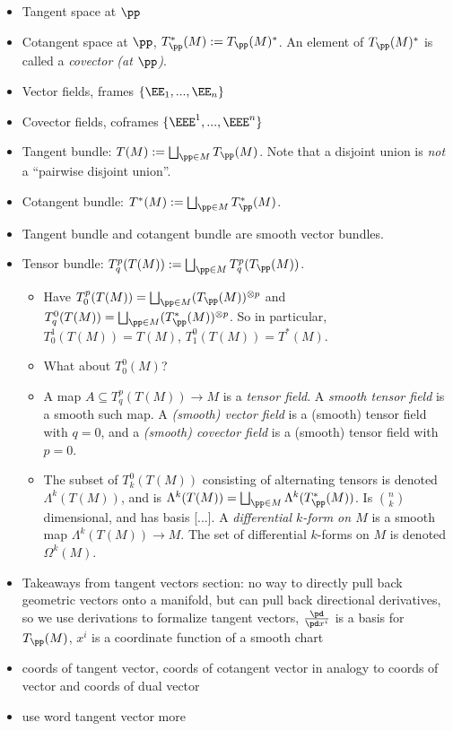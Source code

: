 \begin{itemize}
    \item Tangent space at $\pp$
    \item Cotangent space at $\pp$, $T_\pp^*(M) := T_\pp(M)^*$. An element of $T_\pp(M)^*$ is called a \textit{covector (at $\pp$)}.
    \item Vector fields, frames $\{\EE_1, ..., \EE_n\}$
    \item Covector fields, coframes $\{\EEE^1, ..., \EEE^n\}$
    \item Tangent bundle: $T(M) := \bigsqcup_{\pp \in M} T_\pp(M)$. Note that a disjoint union is \textit{not} a ``pairwise disjoint union''.
    \item Cotangent bundle: $T^*(M) := \bigsqcup_{\pp \in M} T_\pp^*(M)$.
    \item Tangent bundle and cotangent bundle are smooth vector bundles.
    \item Tensor bundle: $T^p_q(T(M)) := \bigsqcup_{\pp \in M} T^p_q(T_\pp(M))$.
    \begin{itemize}
        \item Have $T^p_0(T(M)) = \bigsqcup_{\pp \in M} (T_\pp(M))^{\otimes p}$ and $T^0_q(T(M)) = \bigsqcup_{\pp \in M} (T_\pp^*(M))^{\otimes p}$. So in particular, $T^1_0(T(M)) = T(M)$, $T^0_1(T(M)) = T^*(M)$.
        \item What about $T^0_0(M)$?
        \item A map $A \subseteq T^p_q(T(M)) \rightarrow M$ is a \textit{tensor field}. A \textit{smooth tensor field} is a smooth such map. A \textit{(smooth) vector field} is a (smooth) tensor field with $q = 0$, and a \textit{(smooth) covector field} is a (smooth) tensor field with $p = 0$.
        \item The subset of $T^0_k(T(M))$ consisting of alternating tensors is denoted $\Lambda^k(T(M))$, and is $\Lambda^k(T(M)) = \bigsqcup_{\pp \in M} \Lambda^k(T_\pp^*(M))$. Is $\binom{n}{k}$ dimensional, and has basis [...]. A \textit{differential $k$-form on $M$} is a smooth map $\Lambda^k(T(M)) \rightarrow M$. The set of differential $k$-forms on $M$ is denoted $\Omega^k(M)$.
    \end{itemize}
    \item Takeaways from tangent vectors section: no way to directly pull back geometric vectors onto a manifold, but can pull back directional derivatives, so we use derivations to formalize tangent vectors, $\frac{\pd}{\pd x^i}$ is a basis for $T_\pp(M)$, $x^i$ is a coordinate function of a smooth chart
    \item coords of tangent vector, coords of cotangent vector in analogy to coords of vector and coords of dual vector
    \item use word tangent vector more
\end{itemize}


